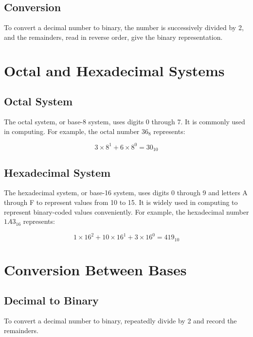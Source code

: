 \documentclass{article}
\begin{document}
\subsection{Conversion}

To convert a decimal number to binary, the number is successively divided by 2, and the remainders, read in reverse order, give the binary representation.

\section{Octal and Hexadecimal Systems}

\subsection{Octal System}

The octal system, or base-8 system, uses digits 0 through 7. It is commonly used in computing. For example, the octal number $36_8$ represents:

\begin{equation}
    3 \times 8^1 + 6 \times 8^0 = 30_{10}
\end{equation}

\subsection{Hexadecimal System}

The hexadecimal system, or base-16 system, uses digits 0 through 9 and letters A through F to represent values from 10 to 15. It is widely used in computing to represent binary-coded values conveniently. For example, the hexadecimal number $1A3_{16}$ represents:

\begin{equation}
    1 \times 16^2 + 10 \times 16^1 + 3 \times 16^0 = 419_{10}
\end{equation}

\section{Conversion Between Bases}

\subsection{Decimal to Binary}

To convert a decimal number to binary, repeatedly divide by 2 and record the remainders.
\end{document}
